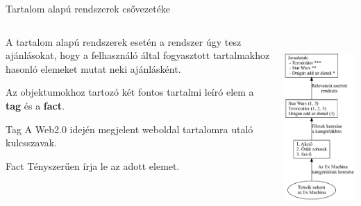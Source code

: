 \documentclass[english, aspectratio=169]{beamer}
\begin{document}
\begin{frame}{Tartalom alapú rendszerek csővezetéke}
\begin{columns}
\begin{column}{.5\textwidth}
A tartalom alapú rendszerek esetén a rendszer úgy tesz ajánlásokat, hogy a felhasználó által fogyasztott tartalmakhoz hasonló elemeket mutat neki ajánlásként.\par\smallskip
Az objektumokhoz tartozó két fontos tartalmi leíró elem a \textbf{tag} és a \textbf{fact}.\par\smallskip
\begin{block}{Tag}
A Web2.0 idején megjelent weboldal tartalomra utaló kulcsszavak.
\end{block}
\begin{block}{Fact}
Tényszerűen írja le az adott elemet.
\end{block}
\end{column}
\begin{column}{.5\textwidth}
\begin{center}
\includegraphics[width=7cm, height=7cm, keepaspectratio]{graphs/recommender_7.png}
\end{center}
\end{column}
\end{columns}
\end{frame}
\end{document}
